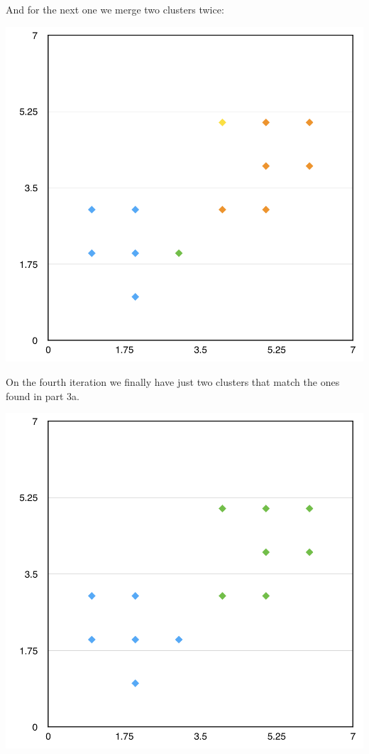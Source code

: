 \documentclass[11pt]{article}
\begin{document}
And for the next one we merge two clusters twice:
\begin{center}
\includegraphics[scale=0.57]{agnes-3.png}
\end{center}

On the fourth iteration we finally have just two clusters that match the ones found in part 3a. 
\begin{center}
\includegraphics[scale=0.57]{agnes-4.png}
\end{center}
\end{document}
